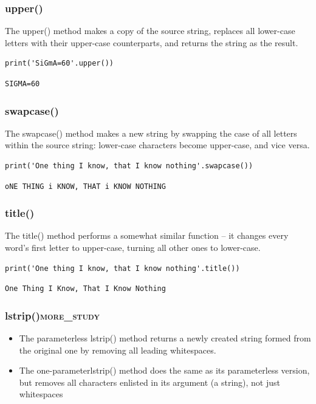 \documentclass[11pt]{article}
\begin{document}
\subsubsection{upper()}
\label{sec:orgc0ec5b4}
The upper() method makes a copy of the source string, replaces all
lower-case letters with their upper-case counterparts, and returns the
string as the result.

\begin{verbatim}
print('SiGmA=60'.upper())
\end{verbatim}

\begin{verbatim}
SIGMA=60
\end{verbatim}

\subsubsection{swapcase()}
\label{sec:org9285c79}
The swapcase() method makes a new string by swapping the case of all
letters within the source string: lower-case characters become
upper-case, and vice versa.

\begin{verbatim}
print('One thing I know, that I know nothing'.swapcase())
\end{verbatim}

\begin{verbatim}
oNE THING i KNOW, THAT i KNOW NOTHING
\end{verbatim}

\subsubsection{title()}
\label{sec:org39f22dd}
The title() method performs a somewhat similar function – it changes
every word’s first letter to upper-case, turning all other ones to
lower-case.

\begin{verbatim}
print('One thing I know, that I know nothing'.title())
\end{verbatim}

\begin{verbatim}
One Thing I Know, That I Know Nothing
\end{verbatim}

\subsubsection{lstrip()\hfill{}\textsc{more\_study}}
\label{sec:orga883d71}
\begin{itemize}
\item The parameterless lstrip() method returns a newly created string
formed from the original one by removing all leading whitespaces.
\item The one-parameterlstrip() method does the same as its parameterless
version, but removes all characters enlisted in its argument (a
string), not just whitespaces
\end{itemize}
\end{document}
